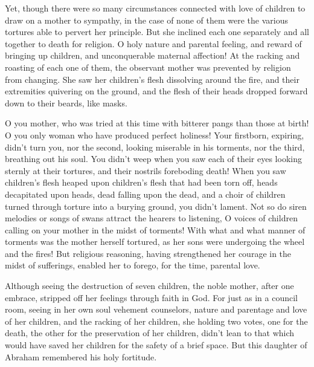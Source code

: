  Yet, though there were so many circumstances connected
with love of children to draw on a mother to sympathy, in the case of
none of them were the various tortures able to pervert her principle.
 But she inclined each one separately and all together to
death for religion.  O holy nature and parental feeling,
and reward of bringing up children, and unconquerable maternal
affection!  At the racking and roasting of each one of
them, the observant mother was prevented by religion from changing.
 She saw her children's flesh dissolving around the fire,
and their extremities quivering on the ground, and the flesh of their
heads dropped forward down to their beards, like masks.

 O you mother, who was tried at this time with bitterer
pangs than those at birth!  O you only woman who have
produced perfect holiness!  Your firstborn, expiring,
didn't turn you, nor the second, looking miserable in his torments, nor
the third, breathing out his soul.  You didn't weep when
you saw each of their eyes looking sternly at their tortures, and their
nostrils foreboding death!  When you saw children's flesh
heaped upon children's flesh that had been torn off, heads decapitated
upon heads, dead falling upon the dead, and a choir of children turned
through torture into a burying ground, you didn't lament. 
Not so do siren melodies or songs of swans attract the hearers to
listening, O voices of children calling on your mother in the midst of
torments!  With what and what manner of torments was the
mother herself tortured, as her sons were undergoing the wheel and the
fires!  But religious reasoning, having strengthened her
courage in the midst of sufferings, enabled her to forego, for the time,
parental love.

 Although seeing the destruction of seven children, the
noble mother, after one embrace, stripped off her feelings through faith
in God.  For just as in a council room, seeing in her own
soul vehement counselors, nature and parentage and love of her children,
and the racking of her children,  she holding two votes,
one for the death, the other for the preservation of her children,
 didn't lean to that which would have saved her children
for the safety of a brief space.  But this daughter of
Abraham remembered his holy fortitude.

